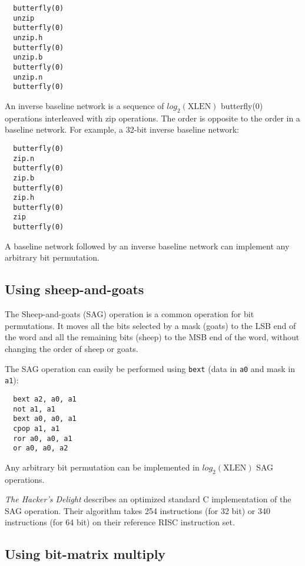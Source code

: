 \begin{verbatim}
  butterfly(0)
  unzip
  butterfly(0)
  unzip.h
  butterfly(0)
  unzip.b
  butterfly(0)
  unzip.n
  butterfly(0)
\end{verbatim}

An inverse baseline network is a sequence of $log_2(\textrm{XLEN})$ butterfly(0)
operations interleaved with zip operations. The order is opposite to the
order in a baseline network. For example, a 32-bit inverse baseline network:

\begin{verbatim}
  butterfly(0)
  zip.n
  butterfly(0)
  zip.b
  butterfly(0)
  zip.h
  butterfly(0)
  zip
  butterfly(0)
\end{verbatim}

A baseline network followed by an inverse baseline network can implement
any arbitrary bit permutation.


\subsection{Using sheep-and-goats}
\label{SAG}

The Sheep-and-goats (SAG) operation is a common operation for bit permutations.
It moves all the bits selected by a mask (goats) to the LSB end of the word
and all the remaining bits (sheep) to the MSB end of the word, without changing
the order of sheep or goats.

The SAG operation can easily be performed using {\tt bext} (data in {\tt a0} and
mask in {\tt a1}):

\begin{verbatim}
  bext a2, a0, a1
  not a1, a1
  bext a0, a0, a1
  cpop a1, a1
  ror a0, a0, a1
  or a0, a0, a2
\end{verbatim}

Any arbitrary bit permutation can be implemented in $log_2(\textrm{XLEN})$ SAG
operations.

{\it The Hacker's Delight} describes an optimized standard C implementation of
the SAG operation. Their algorithm takes 254 instructions (for 32 bit) or 340
instructions (for 64 bit) on their reference RISC instruction
set.~\cite[p.~152f,~162f]{Seander05}


\subsection{Using bit-matrix multiply}

